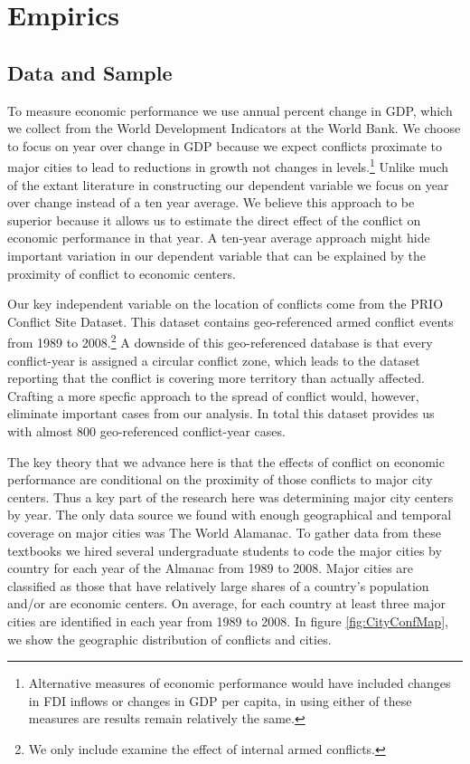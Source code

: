 \section{Empirics}
\label{empirics}

\subsection{Data and Sample}

To measure economic performance we use annual percent change in GDP, which we collect from the World Development Indicators at the World Bank. We choose to focus on year over change in GDP because we expect conflicts proximate to major cities
to lead to reductions in growth not changes in levels.\footnote{Alternative measures of economic performance would have included changes in FDI inflows or changes in GDP per capita, in using either of these measures are results remain relatively the same.} Unlike much of the extant literature in constructing our dependent variable we focus on year over change instead of a ten year average. We believe this approach to be superior because it allows us to estimate the direct effect of the conflict on economic performance in that year. A ten-year average approach might hide important variation in our dependent variable that can be explained by the proximity of conflict to economic centers.

Our key independent variable on the location of conflicts come from the PRIO Conflict Site Dataset. This dataset contains geo-referenced armed conflict events from 1989 to 2008.\footnote{We only include examine the effect of internal armed conflicts.} A downside of this geo-referenced database is that every conflict-year is assigned a circular conflict zone, which leads to the dataset reporting that the conflict is covering more territory than actually affected. Crafting a more specfic approach to the spread of conflict would, however, eliminate important cases from our analysis. In total this dataset provides us with almost 800 geo-referenced conflict-year cases. 

The key theory that we advance here is that the effects of conflict on economic performance are conditional on the proximity of those conflicts to major city centers. Thus a key part of the research here was determining major city centers by year. The only data source we found with enough geographical and temporal coverage on major cities was The World Alamanac. To gather data from these textbooks we hired several undergraduate students to code the major cities by country for each year of the Almanac from 1989 to 2008. Major cities are classified as those that have relatively large shares of a country's population and/or are economic centers. On average, for each country at least three major cities are identified in each year from 1989 to 2008. In figure \ref{fig:CityConfMap}, we show the geographic distribution of conflicts and cities. 

